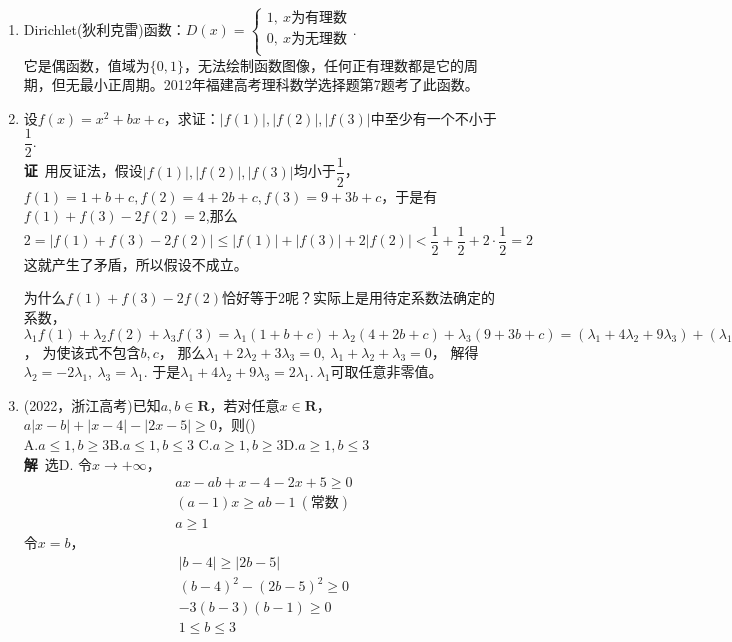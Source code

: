 \begin{enumerate}[label={【\textbf{例\thechapter.\arabic*}】},
 leftmargin=\inteval{\myenumleftmargin}pt,
 itemsep=\inteval{\myenumitempsep}pt,
 itemindent=\inteval{\myenumitemindent}pt]
\item Dirichlet(狄利克雷)函数：$ D(x)=\left\{
\begin{aligned}
    1,\ x\text{为有理数} \\
    0,\ x\text{为无理数} \\
\end{aligned} \right. $. \\
它是偶函数，值域为$ \{0,1\} $，无法绘制函数图像，任何正有理数都是它的周期，但无最小正周期。2012年福建高考理科数学选择题第7题考了此函数。

\item 设$ f(x)=x^2+bx+c $，求证：$ |f(1)|,|f(2)|,|f(3)| $中至少有一个不小于
$ \dfrac{1}{2} $. \\
\textbf{证}\ 用反证法，假设$ |f(1)|,|f(2)|,|f(3)| $均小于$ \dfrac{1}{2} $，
$ f(1)=1+b+c, f(2)=4+2b+c, f(3)=9+3b+c $，于是有$ f(1)+f(3)-2f(2)=2 $,那么
$ 2=|f(1)+f(3)-2f(2)|\leq |f(1)|+|f(3)|+2|f(2)|<\dfrac{1}{2}+\dfrac{1}{2}+2\cdot \dfrac{1}{2}=2 $
这就产生了矛盾，所以假设不成立。

为什么$  f(1)+f(3)-2f(2) $恰好等于2呢？实际上是用待定系数法确定的系数，
$ \lambda_1 f(1)+\lambda_2 f(2)+\lambda_3 f(3)=\lambda_1 (1+b+c)+
\lambda_2 (4+2b+c)+\lambda_3 (9+3b+c)=(\lambda_1+4\lambda_2+9\lambda_3)+
(\lambda_1+2 \lambda_2+ 3\lambda_3)b+(\lambda_1+\lambda_2+\lambda_3)c $，
为使该式不包含$ b,c $，
那么$ \lambda_1+2 \lambda_2+ 3\lambda_3=0,    \ \lambda_1+\lambda_2+\lambda_3=0 $，
解得$ \lambda_2=-2 \lambda_1,\ \lambda_3=\lambda_1 $. 
于是$ \lambda_1+4\lambda_2+9\lambda_3=2\lambda_1.\ \lambda_1$可取任意非零值。 

\item (2022，浙江高考)已知$a,b\in\mathbf{R}$，若对任意$x\in\mathbf{R} $， 
$ a|x-b|+|x-4|-|2x-5|\geq 0$，则(\q ) \\
A.$a\leq 1,b\geq 3$\qquad   B.$a\leq 1,b\leq 3$ \qquad
C.$a\geq 1,b\geq 3$\qquad   D.$a\geq 1,b\leq 3$ \\
\textbf{解}\ 选D. 令$x\to+\infty $，
\begin{gather*}
    ax-ab+x-4-2x+5\geq 0 \\
    (a-1)x\geq ab-1\ (\text{常数}) \\
    a\geq 1
\end{gather*}
令$ x=b $，
\begin{gather*}
    |b-4| \geq |2b-5| \\
    (b-4)^{2}-(2b-5)^{2}\geq 0 \\
    -3(b-3)(b-1)\geq 0 \\
    1 \leq b\leq 3
\end{gather*}


\end{enumerate}

